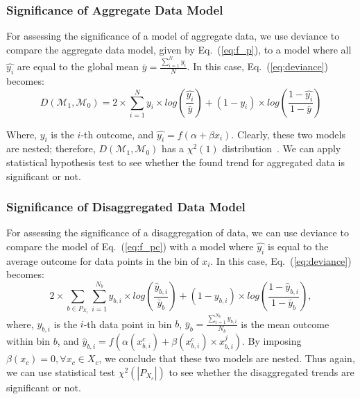 \documentclass[letterpaper]{article} %
\begin{document}
\subsubsection{Significance of Aggregate Data Model}
For assessing the significance of a model of aggregate data, we use deviance to compare the aggregate data model, given by  Eq.~(\ref{eq:f_p}), to a model where all $\hat{y_i}$ are equal to the global mean $\bar{y}=\frac{\sum_{i = 1}^N y_i}{N}$. In this case, Eq.~(\ref{eq:deviance}) becomes:
\begin{equation}
	D(\mathcal{M}_1, \mathcal{M}_0) = 2 \times \sum_{i = 1}^{N} y_i \times log(\frac{\hat{y_i}}{\bar{y}}) + (1 - y_i) \times log(\frac{1 - \hat{y_i}}{1 - \bar{y}})
\end{equation}

Where, $y_i$ is the $i$-th outcome, and $\hat{y_i}=f(\alpha + \beta x_i)$. Clearly, these two models are nested; therefore, $D(\mathcal{M}_1, \mathcal{M}_0)$ has a $\chi^2(1)$ distribution~\cite{deviance}. We can apply statistical hypothesis test to see whether
the found trend for aggregated data is significant or not.

\subsubsection{Significance of Disaggregated Data Model}
For assessing the significance of a disaggregation of data, we can use deviance to compare the model of Eq.~(\ref{eq:f_pc}) with a model where $\hat{y_i}$ is equal to the average outcome for data points in the bin of $x_i$. In this case, Eq.~(\ref{eq:deviance}) becomes:
\begin{equation}
	2 \times \sum_{b \in P_{X_c}} \sum_{i = 1}^{N_b} y_{b, i} \times log(\frac{\hat{y}_{b, i}}{\bar{y}_b}) + (1 - y_{b, i}) \times log(\frac{1 - \hat{y}_{b, i}}{1 - \bar{y}_b}),
\end{equation}
where, $y_{b, i}$ is the $i$-th data point in bin $b$, $\bar{y}_b=\frac{\sum_{i = 1}^{N_b} y_{b, i}}{N_b}$ is the mean outcome within bin $b$, and
$\hat{y}_{b, i}=f(\alpha(x_{b, i}^c) + \beta (x_{b, i}^c) \times x_{b, i}^j)$. By imposing $\beta(x_c) = 0, \forall x_c \in X_c$,
we conclude that these two models are nested. Thus again, we can use statistical test $\chi^2(|P_{X_c}|)$ to see whether
the disaggregated trends are significant or not.
\end{document}
